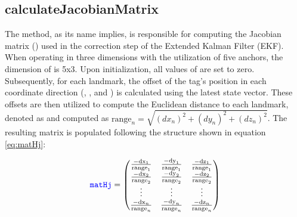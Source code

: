 \subsection{calculateJacobianMatrix}
\label{sub:calculateJacobianMatrix}
The   method, as its name implies, is responsible for computing the Jacobian matrix () used in the correction step of the Extended Kalman Filter (EKF). When operating in three dimensions with the utilization of five anchors, the dimension of  is 5x3.
\vspace{4pt}
\newline
Upon initialization, all values of  are set to zero. Subsequently, for each landmark, the offset of the tag's position in each coordinate direction (, , and ) is calculated using the latest state vector. These offsets are then utilized to compute the Euclidean distance to each landmark, denoted as  and computed as $\textrm{range}_n = \sqrt{(dx_n)^2 + (dy_n)^2 + (dz_n)^2}$.
\vspace{4pt}
\newline
The resulting  matrix is populated following the structure shown in equation \ref{eq:matHj}:

\begin{equation}
\begin{centering}
	\blueconsolas{matHj} =
	\begin{pmatrix}
		\frac{-\textrm{dx}_1}{\textrm{range}_1} & \frac{-\textrm{dy}_1}{\textrm{range}_1} & \frac{-\textrm{dz}_1}{\textrm{range}_1} \\
		\frac{-\textrm{dx}_2}{\textrm{range}_2} & \frac{-\textrm{dy}_2}{\textrm{range}_2} & \frac{-\textrm{dz}_2}{\textrm{range}_2} \\
		\vdots & \vdots & \vdots \\
		\frac{-\textrm{dx}_n}{\textrm{range}_n} & \frac{-\textrm{dy}_n}{\textrm{range}_n} & \frac{-\textrm{dz}_n}{\textrm{range}_n} \\
	\end{pmatrix}
\end{centering}
\label{eq:matHj}
\end{equation}

